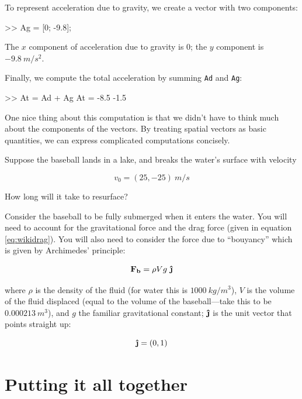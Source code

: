 \documentclass[
]{book}
\numberwithin{Answer}{chapter}
\numberwithin{Exercise}{chapter}
\renewcommand{\vec}[1]{\bm{\mathbf{#1}}}
\newcommand{\uveci}{{\bm{\hat{\textnormal{\bfseries\i}}}}}
\newcommand{\uvecj}{{\bm{\hat{\textnormal{\bfseries\j}}}}}
\newcommand{\uvec}[1]{%
    \ifthenelse{\equal{#1}{i}}%
        {\uveci}{%
    \ifthenelse{\equal{#1}{j}}%
        {\uvecj}{%
    {\bm{\hat{\mathbf{#1}}}}%
}}}
\begin{document}
To represent acceleration due to gravity, we create a vector
with two components:

\begin{code}
>> Ag = [0; -9.8];
\end{code}

The $x$ component of acceleration due to gravity is 0; the $y$ component is $-9.8 ~ m/s^2$.

Finally, we compute the total acceleration by summing {\tt Ad} and {\tt Ag}:

\begin{code}
>> At = Ad + Ag
At =  -8.5  -1.5
\end{code}

One nice thing about this computation is that we didn't have to think
much about the components of the vectors.  By treating spatial vectors
as basic quantities, we can express complicated computations concisely.

\begin{ex}
Suppose the baseball lands in a lake, and breaks the water's surface
    with velocity

\begin{equation}
    v_0 = (25, -25) ~  m/s
\end{equation}

How long will it take to resurface?

Consider the baseball to be fully
    submerged when it enters the water. You will need to account for the
    gravitational force and the drag force (given in equation
    \eqref{eq:wikidrag}). You will also need to consider the force due
    to ``bouyancy'' which is given by Archimedes' principle:

\begin{equation}
    \vec{F_b} = \rho V g ~ \uvec{j}
\end{equation}

where $\rho$ is the density of the fluid (for water this is $1000 ~ kg /
    m^3$), $V$ is the volume of the fluid displaced (equal to the volume
    of the baseball---take this to be $0.000213 ~ m^3$), and $g$ the
    familiar gravitational constant; $\uvec{j}$ is the unit vector that
    points straight up:

\begin{equation}
    \uvec{j} = (0, 1)
\end{equation}

\end{ex}

\section{Putting it all together}
\end{document}
